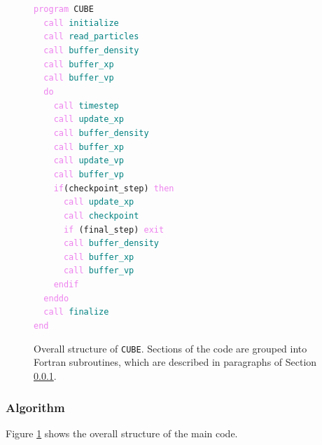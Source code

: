 \documentclass[10pt,twocolumn,reprint]{emulateapj}
\newcommand{\tcv}{\textcolor{violet}}
\newcommand{\tcx}{\textcolor{teal}}
\begin{document}
\begin{figure}[]
{\tt \tcv{program} CUBE\\
\indent \ \ \tcv{call} \tcx{initialize}\\
\indent \ \ \tcv{call} \tcx{read\_particles}\\
\indent \ \ \tcv{call} \tcx{buffer\_density}\\
\indent \ \ \tcv{call} \tcx{buffer\_xp}\\
\indent \ \ \tcv{call} \tcx{buffer\_vp}\\
\indent \ \ \tcv{do}\\
\indent \ \ \ \ \tcv{call} \tcx{timestep}\\
\indent \ \ \ \ \tcv{call} \tcx{update\_xp}\\
\indent \ \ \ \ \tcv{call} \tcx{buffer\_density}\\
\indent \ \ \ \ \tcv{call} \tcx{buffer\_xp}\\
\indent \ \ \ \ \tcv{call} \tcx{update\_vp}\\
\indent \ \ \ \ \tcv{call} \tcx{buffer\_vp}\\
\indent \ \ \ \ \tcv{if}(checkpoint\_step) \tcv{then}\\
\indent \ \ \ \ \ \ \tcv{call} \tcx{update\_xp}\\
\indent \ \ \ \ \ \ \tcv{call} \tcx{checkpoint}\\
\indent \ \ \ \ \ \ \tcv{if} (final\_step) \tcv{exit}\\
\indent \ \ \ \ \ \ \tcv{call} \tcx{buffer\_density}\\
\indent \ \ \ \ \ \ \tcv{call} \tcx{buffer\_xp}\\
\indent \ \ \ \ \ \ \tcv{call} \tcx{buffer\_vp}\\
\indent \ \ \ \ \tcv{endif}\\
\indent \ \ \tcv{enddo}\\
\indent \ \ \tcv{call} \tcx{finalize}\\
\tcv{end}\\}
\caption{Overall structure of {\tt CUBE}. Sections of the code are grouped into Fortran subroutines, which are described in paragraphs of Section \ref{sss.algorithm}.}
\label{fig.code}
\end{figure}

\subsubsection{Algorithm}\label{sss.algorithm}
Figure \ref{fig.code} shows the overall structure of the main code.
\end{document}
